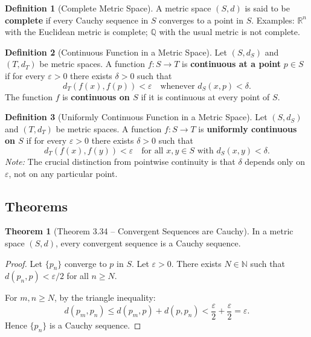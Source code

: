 \documentclass[12pt,a4paper]{article}
\theoremstyle{definition}
\newtheorem{definition}{Definition}[section]
\newtheorem{theorem}{Theorem}[section]
\newcommand{\R}{\mathbb{R}}
\newcommand{\Q}{\mathbb{Q}}
\newcommand{\N}{\mathbb{N}}
\newcommand{\eps}{\varepsilon}
\begin{document}
\begin{definition}[Complete Metric Space]
A metric space $(S, d)$ is said to be \textbf{complete} if every Cauchy sequence in $S$ converges to a point in $S$. Examples: $\R^n$ with the Euclidean metric is complete; $\Q$ with the usual metric is not complete.
\end{definition}

\begin{definition}[Continuous Function in a Metric Space]
Let $(S, d_S)$ and $(T, d_T)$ be metric spaces. A function $f: S \to T$ is \textbf{continuous at a point} $p \in S$ if for every $\eps > 0$ there exists $\delta > 0$ such that
\[
    d_T(f(x), f(p)) < \eps \quad \text{whenever } d_S(x, p) < \delta.
\]
The function $f$ is \textbf{continuous on $S$} if it is continuous at every point of $S$.
\end{definition}

\begin{definition}[Uniformly Continuous Function in a Metric Space]
Let $(S, d_S)$ and $(T, d_T)$ be metric spaces. A function $f: S \to T$ is \textbf{uniformly continuous on $S$} if for every $\eps > 0$ there exists $\delta > 0$ such that
\[
    d_T(f(x), f(y)) < \eps \quad \text{for all } x, y \in S \text{ with } d_S(x, y) < \delta.
\]
\textit{Note:} The crucial distinction from pointwise continuity is that $\delta$ depends only on $\eps$, not on any particular point.
\end{definition}

\subsection{Theorems}

\begin{theorem}[Theorem 3.34 -- Convergent Sequences are Cauchy]
In a metric space $(S, d)$, every convergent sequence is a Cauchy sequence.
\end{theorem}

\begin{proof}
Let $\{p_n\}$ converge to $p$ in $S$. Let $\eps > 0$. There exists $N \in \N$ such that $d(p_n, p) < \eps/2$ for all $n \geq N$.

For $m, n \geq N$, by the triangle inequality:
\[
    d(p_m, p_n) \leq d(p_m, p) + d(p, p_n) < \frac{\eps}{2} + \frac{\eps}{2} = \eps.
\]
Hence $\{p_n\}$ is a Cauchy sequence.
\end{proof}
\end{document}
